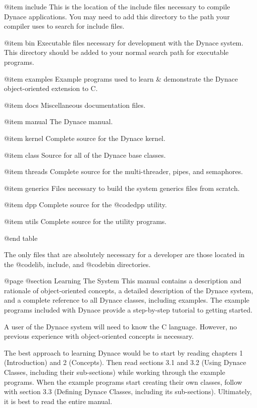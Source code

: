 @item include
This is the location of the include files necessary to compile Dynace
applications.  You may need to add this directory to the path your
compiler uses to search for include files.

@item bin
Executable files necessary for development with the Dynace system.
This directory should be added to your normal search path for executable
programs.

@item examples
Example programs used to learn & demonstrate the Dynace object-oriented
extension to C.

@item docs
Miscellaneous documentation files.

@item manual
The Dynace manual.

@item kernel
Complete source for the Dynace kernel.

@item class
Source for all of the Dynace base classes.

@item threads
Complete source for the multi-threader, pipes, and semaphores.

@item generics
Files necessary to build the system generics files from scratch.

@item dpp
Complete source for the @code{dpp} utility.

@item utils
Complete source for the utility programs.

@end table



The only files that are absolutely necessary for a developer are those
located in the @code{lib, include,} and @code{bin}
directories.




@page
@section Learning The System
This manual contains a description and rationale of object-oriented
concepts, a detailed description of the Dynace system, and a complete
reference to all Dynace classes, including examples.  The example programs
included with Dynace provide a step-by-step tutorial to getting started.

A user of the Dynace system will need to know the C language.  However,
no previous experience with object-oriented concepts is necessary.

The best approach to learning Dynace would be to start by reading
chapters 1 (Introduction) and 2 (Concepts).  Then read sections 3.1 and
3.2 (Using Dynace Classes, including their sub-sections) while working
through the example programs.  When the example programs start creating
their own classes, follow with section 3.3 (Defining Dynace Classes,
including its sub-sections).  Ultimately, it is best to read the entire
manual.

